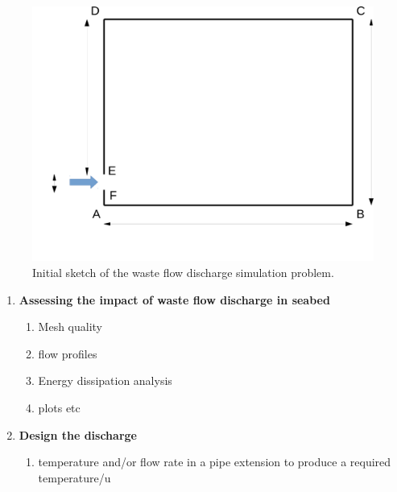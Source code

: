 \documentclass[12pts,a4paper,amsmath,amssymb,floatfix]{article}%
\begin{document}
\begin{enumerate}[label=\bfseries Problem \arabic*:]
\begin{figure}[h]
\begin{center}
\includegraphics[width=15.cm,height=8.cm,clip]{./Pics/Sketch_Prob2b}
\caption{Initial sketch of the waste flow discharge simulation problem. }
\label{EG501V_Assignment:Sketch2}
\end{center}
\end{figure}

\begin{enumerate}[label=\bfseries Task \arabic*]

\item\label{Practical2:Task1} {\bf Assessing the impact of waste flow discharge in seabed}
  \begin{enumerate}
     \item Mesh quality
     \item flow profiles
     \item Energy dissipation analysis
     \item plots etc
  \end{enumerate}


\item\label{Practical2:Task2} {\bf Design the discharge}
   \begin{enumerate}
      \item temperature and/or flow rate in a  pipe extension to produce a required temperature/u
   \end{enumerate}

\end{enumerate}

\end{enumerate}
\clearpage
\end{document}
